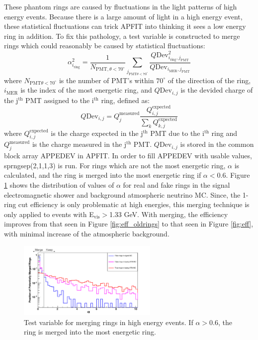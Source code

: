 These phantom rings are caused by fluctuations in the light patterns of high energy events.  Because there is a large amount of light in a high energy event, these statistical fluctuations can trick APFIT into thinking it sees a low energy ring in addition.  To fix this pathology, a test variable is constructed to merge rings which could reasonably be caused by statistical fluctuations:
\begin{equation}
	\alpha^2_{i_\textrm{ring}}=\frac{1}{N_{\textrm{PMT},\theta<70^\circ}} \sum \limits_{j_{\textrm{PMT}\theta<70^\circ}} \frac{Q\textrm{Dev}_{i_\textrm{ring},j_\textrm{PMT}}^2}{Q\textrm{Dev}_{i_\textrm{MER},j_\textrm{PMT}}}
	\label{eq:alpha}
\end{equation}
where $N_{\textrm{PMT}\theta<70^\circ}$ is the number of PMT's within $70^\circ$ of the direction of the ring, $i_\textrm{MER}$ is the index of the most energetic ring, and $Q\textrm{Dev}_{i,j}$ is the devided charge of the j$^\textrm{th}$ PMT assigned to the i$^\textrm{th}$ ring, defined as:
\begin{equation}
 	Q\textrm{Dev}_{i,j}=Q_j^\textrm{measured}\frac{Q_{i,j}^\textrm{expected}}{\sum \limits_k Q_{k,j}^\textrm{expected}}
	\label{eq:qdev}
\end{equation}		
where $Q_{i,j}^\textrm{expected}$ is the charge expected in the j$^\textrm{th}$ PMT due to the i$^\textrm{th}$ ring and $Q_j^\textrm{measured}$ is the charge measured in the j$^\textrm{th}$ PMT.   $Q\textrm{Dev}_{i,j}$ is stored in the common block array APPEDEV in APFIT.  In order to fill APPEDEV with usable values, sprngsep(2,1,1,3) is run.  For rings which are not the most energetic ring, $\alpha$ is calculated, and the ring is merged into the most energetic ring if $\alpha<0.6$.  Figure \ref{fig:apdev} shows the distribution of values of $\alpha$ for real and fake rings in the signal electromagnetic shower and background atmospheric neutrino MC.  Since, the 1-ring cut efficiency is only problematic at high energies, this merging technique is only applied to events with E$_\textrm{vis}>$1.33 GeV.  With merging, the efficiency improves from that seen in Figure \ref{fig:eff_oldrings} to that seen in Figure \ref{fig:eff}, with minimal increase of the atmospheric background.  



\begin{figure}
\includegraphics[width=0.6\textwidth]{figures/apdev.pdf}
\caption{Test variable for merging rings in high energy events.  If $\alpha>0.6$, the ring is merged into the most energetic ring.}
\label{fig:apdev}
\end{figure}